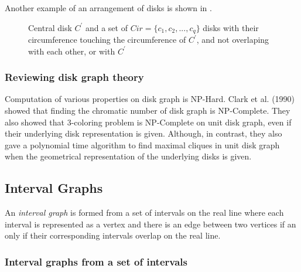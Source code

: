 Another example of an arrangement of disks is shown in .

\begin{figure}
    \centering
    \caption{Central disk {$C^\prime$} and a set of $Cir = \{c_1, c_2, ..., c_q\}$ disks with their circumference touching the circumference of {$C^\prime$}, and not overlaping with each other, or with $C^\prime$}
    \label{figure:example-disk-graph-2}
\end{figure}

\subsubsection{Reviewing disk graph theory}

Computation of various properties on disk graph is NP-Hard. Clark et al. (1990) \cite{Clark1990} showed that finding the chromatic number of disk graph is NP-Complete. They also showed that 3-coloring problem is NP-Complete on unit disk graph, even if their underlying disk representation is given. Although, in contrast, they also gave a polynomial time algorithm to find maximal cliques in unit disk graph when the geometrical representation of the underlying disks is given.

\subsection{Interval Graphs}\label{subsection:interval-graphs}

An \textit{interval graph}  is formed from a set of intervals on the real line where each interval is represented as a vertex and there is an edge between two vertices if an only if their corresponding intervals overlap on the real line.

\subsubsection{Interval graphs from a set of intervals}

